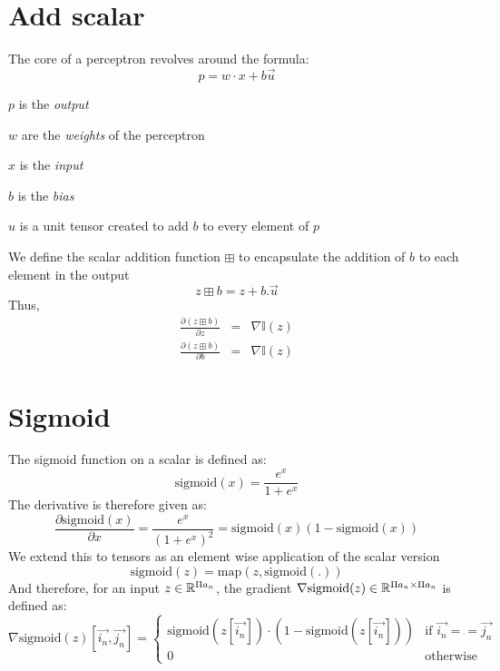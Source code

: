 \documentclass{article}
\begin{document}
\section {Add scalar}
  The core of a perceptron revolves around the formula:
  \[
      p = w \cdot x + b \overrightarrow u
  \]
  \begin{where}
    \item $p$ is the \emph{output}
    \item $w$ are the \emph{weights} of the perceptron
    \item $x$ is the \emph{input}
    \item $b$ is the \emph{bias}
    \item $u$ is a unit tensor created to add $b$
              to every element of $p$
  \end{where}
  
  We define the scalar addition function $\boxplus$ to encapsulate
  the addition of $b$ to each element in the output
  \[
      z \boxplus b = z + b.\overrightarrow{u}
  \]
  Thus,
  \begin{eqnarray*}
    \frac{\partial (z \boxplus b) }{\partial z} 
      & = & \nabla \mathbb{I}(z)
    \\
    \frac{\partial (z \boxplus b) }{\partial b} 
      & = & \nabla \mathbb{I}(z)
  \end{eqnarray*}
  
\section {Sigmoid}
  The sigmoid function on a scalar is defined as:
  \[
    \text{sigmoid}(x) = \frac{e^x}{1 + e^x}
  \]
  The derivative is therefore given as:
  \[
    \frac{\partial \text{sigmoid}(x)}
         {\partial x}
    =
    \frac{e^x}{(1 + e^x)^2}
    =
    \text{sigmoid}(x)(1 - \text{sigmoid}(x))
  \]
  We extend this to tensors as 
  an element wise application of the scalar version
  \[
    \text{sigmoid}(z) = \text{map}(z, \text{sigmoid}(.))
  \]
  And therefore, for an input $z \in \mathbb{R}^{\Pi a_n}$,
  the gradient 
  $\nabla \text{sigmoid}(z) \in \mathbb{R}^{\Pi a_n \times \Pi a_n}$ 
  is defined as:
  \[
    \nabla \text{sigmoid}(z)[\overrightarrow{i_n}, \overrightarrow{j_n}]
    =
    \begin{cases}
      \text{sigmoid}(z[\overrightarrow{i_n}])
      \cdot
      (1 - \text{sigmoid}(z[\overrightarrow{i_n}]))
         & \text{if } \overrightarrow{i_n} == \overrightarrow{j_n}
      \\
      0  & \text{otherwise}
    \end{cases}
  \]
  
\end{document}
